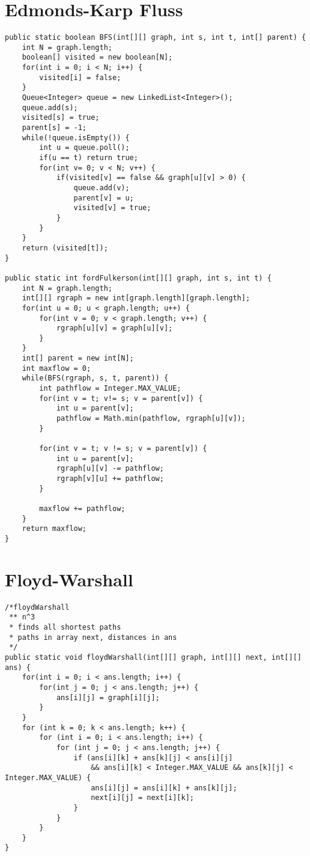 \documentclass[10pt,a4paper]{article}
\begin{document}
\section{Edmonds-Karp Fluss}
\begin{lstlisting}
public static boolean BFS(int[][] graph, int s, int t, int[] parent) {
    int N = graph.length;
    boolean[] visited = new boolean[N];
    for(int i = 0; i < N; i++) {
        visited[i] = false;
    }
    Queue<Integer> queue = new LinkedList<Integer>();
    queue.add(s);
    visited[s] = true;
    parent[s] = -1;
    while(!queue.isEmpty()) {
        int u = queue.poll();
        if(u == t) return true;
        for(int v= 0; v < N; v++) {
            if(visited[v] == false && graph[u][v] > 0) {
                queue.add(v);
                parent[v] = u;
                visited[v] = true;
            }
        }
    }
    return (visited[t]);
}
  
public static int fordFulkerson(int[][] graph, int s, int t) {
    int N = graph.length;
    int[][] rgraph = new int[graph.length][graph.length];
    for(int u = 0; u < graph.length; u++) {
        for(int v = 0; v < graph.length; v++) {
            rgraph[u][v] = graph[u][v];
        }
    }
    int[] parent = new int[N];
    int maxflow = 0;
    while(BFS(rgraph, s, t, parent)) {
        int pathflow = Integer.MAX_VALUE;
        for(int v = t; v!= s; v = parent[v]) {
            int u = parent[v];
            pathflow = Math.min(pathflow, rgraph[u][v]);
        }
            
        for(int v = t; v != s; v = parent[v]) {
            int u = parent[v];
            rgraph[u][v] -= pathflow;
            rgraph[v][u] += pathflow;
        }
            
        maxflow += pathflow;
    }
    return maxflow;
}
\end{lstlisting}
\newpage
\section{Floyd-Warshall}
\begin{lstlisting}
/*floydWarshall
 ** n^3
 * finds all shortest paths
 * paths in array next, distances in ans
 */
public static void floydWarshall(int[][] graph, int[][] next, int[][] ans) {
    for(int i = 0; i < ans.length; i++) {
        for(int j = 0; j < ans.length; j++) {
            ans[i][j] = graph[i][j];
        }
    }
    for (int k = 0; k < ans.length; k++) {
        for (int i = 0; i < ans.length; i++) {
            for (int j = 0; j < ans.length; j++) {
                if (ans[i][k] + ans[k][j] < ans[i][j]
                    && ans[i][k] < Integer.MAX_VALUE && ans[k][j] < Integer.MAX_VALUE) {
                    ans[i][j] = ans[i][k] + ans[k][j];
                    next[i][j] = next[i][k];
                }
            }
        }
    }
}
\end{lstlisting}
\end{document}
